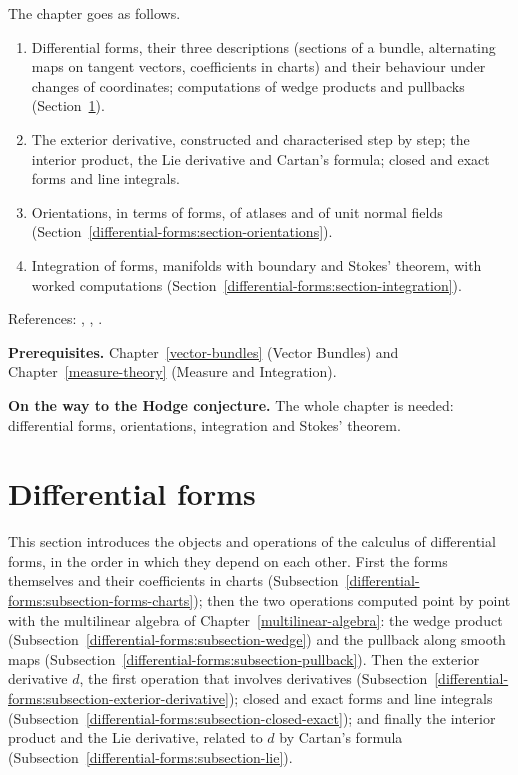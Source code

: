 The chapter goes as follows.
\begin{enumerate}
\item Differential forms, their three descriptions (sections of a bundle, alternating maps on tangent vectors, coefficients in charts) and their behaviour under changes of
coordinates; computations of wedge products and pullbacks (Section~\ref{differential-forms:section-forms}).
\item The exterior derivative, constructed and characterised step by step; the interior product, the Lie derivative and Cartan's formula; closed and exact forms and line
integrals.
\item Orientations, in terms of forms, of atlases and of unit normal fields (Section~\ref{differential-forms:section-orientations}).
\item Integration of forms, manifolds with boundary and Stokes' theorem, with worked computations (Section~\ref{differential-forms:section-integration}).
\end{enumerate}
References: \cite{lee-smooth-manifolds}, \cite{warner-foundations}, \cite{spivak-calculus-manifolds}.

\noindent\textbf{Prerequisites.} Chapter~\ref{vector-bundles} (Vector Bundles) and Chapter~\ref{measure-theory} (Measure and Integration).

\noindent\textbf{On the way to the Hodge conjecture.} The whole chapter is needed: differential forms, orientations, integration and Stokes' theorem.

\section{Differential forms}\label{differential-forms:section-forms}

This section introduces the objects and operations of the calculus of differential forms, in the order in which they depend on each other. First the forms themselves and their
coefficients in charts (Subsection~\ref{differential-forms:subsection-forms-charts}); then the two operations computed point by point with the multilinear algebra of
Chapter~\ref{multilinear-algebra}: the wedge product (Subsection~\ref{differential-forms:subsection-wedge}) and the pullback along smooth maps (Subsection~\ref{differential-forms:subsection-pullback}). Then the
exterior derivative $d$, the first operation that involves derivatives (Subsection~\ref{differential-forms:subsection-exterior-derivative}); closed and exact forms and line integrals
(Subsection~\ref{differential-forms:subsection-closed-exact}); and finally the interior product and the Lie derivative, related to $d$ by Cartan's formula
(Subsection~\ref{differential-forms:subsection-lie}).

